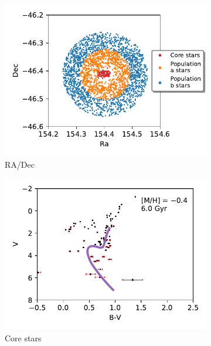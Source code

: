\documentclass[11pt]{article}
\begin{document}
\begin{figure}[h]
	\centering
	\begin{subfigure}[b]{0.49\textwidth}
		\centering
		\includegraphics[width=\textwidth]{../Figures/radec}
		\vspace{-7mm}
		\caption{RA/Dec}
		\label{fig:radec}
	\end{subfigure}
	\hfill
	\begin{subfigure}[b]{0.49\textwidth}
		\centering
		\includegraphics[width=\textwidth]{../Figures/popmanual}
		\vspace{-7mm}
		\caption{Core stars}
		\label{fig:popman}
	\end{subfigure}
	\hfill
	\begin{subfigure}[b]{0.49\textwidth}

\end{subfigure}
\end{figure}
\end{document}
